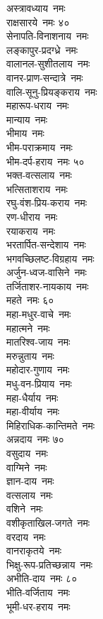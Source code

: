 \begin{multicols}{2}
\begin{flushleft}
अस्त्रावध्याय~नमः\\
राक्षसारये~नमः \hfill ४०\\
सेनापति-विनाशनाय~नमः\\
लङ्कापुर-प्रदग्ध्रे~नमः\\
वालानल-सुशीतलाय~नमः\\
वानर-प्राण-सन्दात्रे~नमः\\
वालि-सूनु-प्रियङ्कराय~नमः\\
महारूप-धराय~नमः\\
मान्याय~नमः\\
भीमाय~नमः\\
भीम-पराक्रमाय~नमः\\
भीम-दर्प-हराय~नमः \hfill ५०\\
भक्त-वत्सलाय~नमः\\
भत्सिताशराय~नमः\\
रघु-वंश-प्रिय-कराय~नमः\\
रण-धीराय~नमः\\
रयाकराय~नमः\\
भरतार्पित-सन्देशाय~नमः\\
भगवच्छिलष्ट-विग्रहाय~नमः\\
अर्जुन-ध्वज-वासिने~नमः\\
तर्जिताशर-नायकाय~नमः\\
महते~नमः \hfill ६०\\
महा-मधुर-वाचे~नमः\\
महात्मने~नमः\\
मातरिश्व-जाय~नमः\\
मरुन्नुताय~नमः\\
महोदार-गुणाय~नमः\\
मधु-वन-प्रियाय~नमः\\
महा-धैर्याय~नमः\\
महा-वीर्याय~नमः\\
मिहिराधिक-कान्तिमते~नमः\\
अन्नदाय~नमः \hfill ७०\\
वसुदाय~नमः \\
वाग्मिने~नमः\\
ज्ञान-दाय~नमः\\
वत्सलाय~नमः\\
वशिने~नमः\\
वशीकृताखिल-जगते~नमः\\
वरदाय~नमः\\
वानराकृतये~नमः\\
भिक्षु-रूप-प्रतिच्छन्नाय~नमः\\
अभीति-दाय~नमः \hfill ८०\\
भीति-वर्जिताय~नमः \\
भूमी-धर-हराय~नमः\\

\end{flushleft}
\end{multicols}

